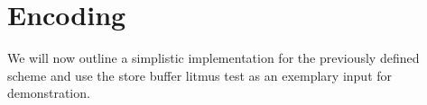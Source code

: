 \section{{\SMTLIB} Encoding}

We will now outline a simplistic {\CPP} implementation for  the previously defined scheme and use the store buffer litmus test as an exemplary input for demonstration.
